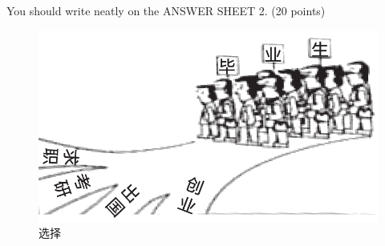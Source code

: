 You should write neatly on the ANSWER SHEET 2. (20 points)


\begin{figure}[h!]
	\centering
	\includegraphics[width=0.56\linewidth]{picture/2013.png}
	\caption*{选择}
\end{figure}

